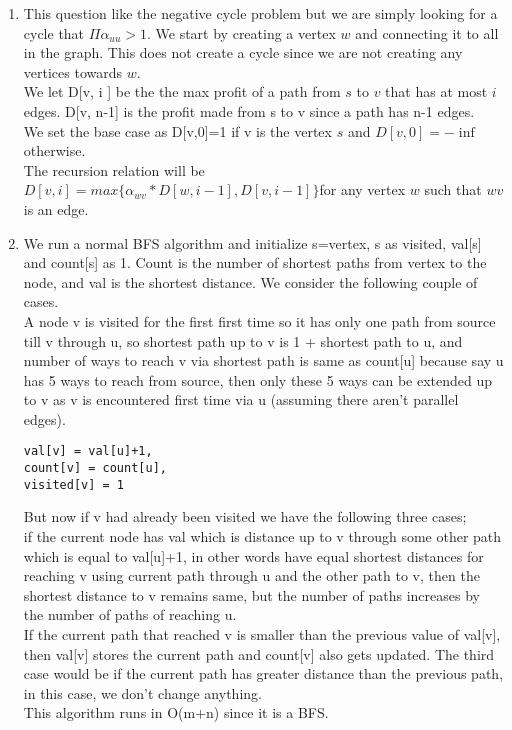 \begin{enumerate}[1.]
	\item
	This question like the negative cycle problem but we are simply looking for a cycle that $\Pi\alpha_{uu}>1$. We start by creating a vertex $w$ and connecting it to all in the graph. This does not create a cycle since we are not creating any vertices towards $w$.\\
	We let D[v, i ] be the the max profit of a path from $s$ to $v$ that has at most $i$ edges. D[v, n-1] is the profit made from s to v since a path has n-1 edges.\\
	We set the base case as D[v,0]=1 if v is the vertex $s$ and $D[v,0]=-\inf$ otherwise.\\
	The recursion relation will be $D[v,i]=max\{\alpha_{wv}*D[w,i-1], D[v, i-1] \} $for any vertex $w$ such that $wv$ is an edge.\\ 
	\item
	 We run a normal BFS algorithm and initialize s=vertex, s as visited, val[s] and count[s] as 1. Count is the number of shortest paths from vertex to the node, and val is the shortest distance. We consider the following couple of cases.\\ 
	A node v is visited for the first first time so it has only one path from source till v through u, so shortest path up to v is 1 + shortest path to u, and number of ways to reach v via shortest path is same as count[u] because say u has 5 ways to reach from source, then only these 5 ways can be extended up to v as v is encountered first time via u (assuming there aren't parallel edges). \begin{verbatim}val[v] = val[u]+1,    
count[v] = count[u], 
visited[v] = 1	 \end{verbatim}
But now if v had already been visited we have the following three cases;\\
if the current node has val which is distance up to v through some other path which is equal to val[u]+1, in other words have equal shortest distances for reaching v using current path through u and the other path to v, then the shortest distance to v remains same, but the number of paths increases by the number of paths of reaching u.\\
If the current path that reached v is smaller than the previous value of val[v], then val[v] stores the current path and count[v] also gets updated.
The third case would be if the current path has greater distance than the previous path, in this case, we don't change anything.\\
This algorithm runs in O(m+n) since it is a BFS.




\end{enumerate}
